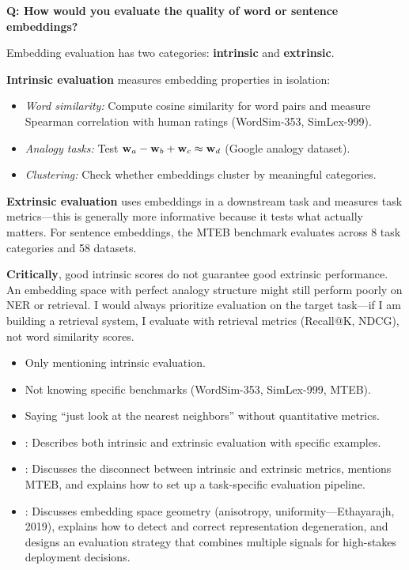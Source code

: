 \begin{interviewq}
\textbf{Q: How would you evaluate the quality of word or sentence embeddings?}

 \quad {} \quad \badgefreq{\freqmed}

\stronganswer
Embedding evaluation has two categories: \textbf{intrinsic} and
\textbf{extrinsic}.

\textbf{Intrinsic evaluation} measures embedding properties in isolation:
\begin{itemize}
    \item \emph{Word similarity:} Compute cosine similarity for word pairs
    and measure Spearman correlation with human ratings (WordSim-353,
    SimLex-999).
    \item \emph{Analogy tasks:} Test $\mathbf{w}_a - \mathbf{w}_b + \mathbf{w}_c \approx \mathbf{w}_d$
    (Google analogy dataset).
    \item \emph{Clustering:} Check whether embeddings cluster by meaningful
    categories.
\end{itemize}

\textbf{Extrinsic evaluation} uses embeddings in a downstream task and
measures task metrics---this is generally more informative because it tests
what actually matters.  For sentence embeddings, the MTEB benchmark
evaluates across 8 task categories and 58 datasets.

\textbf{Critically}, good intrinsic scores do not guarantee good extrinsic
performance.  An embedding space with perfect analogy structure might still
perform poorly on NER or retrieval.  I would always prioritize evaluation
on the target task---if I am building a retrieval system, I evaluate with
retrieval metrics (Recall@K, NDCG), not word similarity scores.

\redflags
\begin{itemize}
    \item Only mentioning intrinsic evaluation.
    \item Not knowing specific benchmarks (WordSim-353, SimLex-999, MTEB).
    \item Saying ``just look at the nearest neighbors'' without quantitative
    metrics.
\end{itemize}


\goodgreat
\begin{itemize}
    \item {}: Describes both intrinsic and extrinsic evaluation
    with specific examples.
    \item {}: Discusses the disconnect between intrinsic and
    extrinsic metrics, mentions MTEB, and explains how to set up a
    task-specific evaluation pipeline.
    \item {}: Discusses embedding space geometry (anisotropy,
    uniformity---Ethayarajh, 2019), explains how to detect and correct
    representation degeneration, and designs an evaluation strategy that
    combines multiple signals for high-stakes deployment decisions.
\end{itemize}


\end{interviewq}
